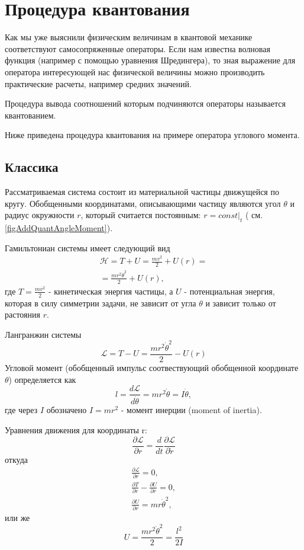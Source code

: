 \section{Процедура квантования}
Как мы уже выяснили физическим величинам в квантовой механике
соответствуют самосопряженные операторы. Если нам известна волновая
функция (например с помощью уравнения Шредингера), то зная выражение
для оператора интересующей нас физической величины можно производить
практические расчеты, например средних значений.

Процедура вывода соотношений которым подчиняются операторы называется
квантованием. 

Ниже приведена процедура квантования на примере оператора углового
момента.


 
\subsection{Классика}
Рассматриваемая система состоит из материальной частицы движущейся по
кругу. Обобщенными координатами, описывающими частицу являются угол
$\theta$ и радиус окружности $r$, который считается постоянным: $r =
\left. const \right|_t$ ( см. \autoref{figAddQuantAngleMoment}).

Гамильтониан системы имеет следующий вид 
\begin{eqnarray}
\mathcal{H} = T + U = \frac{m v^2}{2} + U\left( r \right) = 
\nonumber \\
= \frac{m r^2 \dot{\theta}^2 }{2} + U\left( r \right),
\nonumber
\end{eqnarray}
где $T = \frac{m v^2}{2}$ - кинетическая энергия частицы, 
а $U$ - потенциальная энергия, которая в силу симметрии задачи, не
зависит от угла $\theta$ и зависит только от растояния $r$.

Лангранжин системы
\[
\mathcal{L} = T - U = \frac{m r^2 \dot{\theta}^2 }{2} - U\left( r \right)
\]
Угловой момент (обобщенный импульс соотвествующий обобщенной
координате $\theta$) определяется как 
\begin{equation}
l = \frac{d \mathcal{L}}{d \dot{\theta}} = 
m r^2 \dot{\theta} = I \dot{\theta},
\label{eqAngualrMomentumClass}
\end{equation}
где через $I$ обозначено $I = m r^2$ - момент инерции (moment of
inertia).

Уравнения движения для координаты r:
\[
\frac{ \partial \mathcal{L} }{\partial r} = 
\frac{d}{d t} \frac{\partial \mathcal{L}}{\partial \dot{r}}
\]
 откуда
\begin{eqnarray}
\frac{ \partial \mathcal{L} }{\partial r} = 0,
\nonumber \\
\frac{ \partial T }{\partial r} - \frac{ \partial U }{\partial r} = 0,
\nonumber \\
\frac{\partial U}{\partial r} = m r \dot{\theta}^2,
\nonumber
\end{eqnarray}
 или же
\[
 U = \frac{m r^2 \dot{\theta}^2}{2} = \frac{l^2}{2 I}
\]
 
